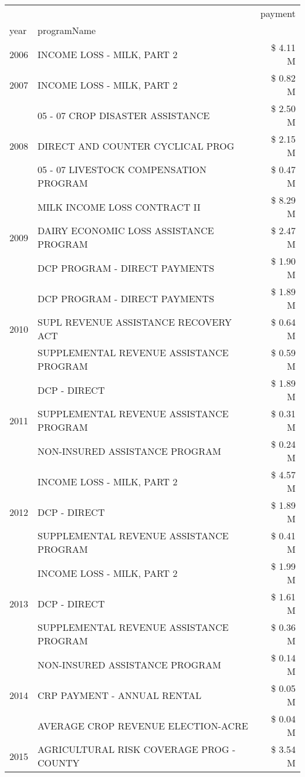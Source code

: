 \begin{tabular}{llr}
\toprule
 &  & payment \\
year & programName &  \\
\midrule
2006 & INCOME LOSS - MILK, PART 2 & \$ 4.11 M \\
\cline{1-3}
2007 & INCOME LOSS - MILK, PART 2 & \$ 0.82 M \\
\cline{1-3}
\multirow[t]{3}{*}{2008} & 05 - 07 CROP DISASTER ASSISTANCE & \$ 2.50 M \\
 & DIRECT AND COUNTER CYCLICAL PROG & \$ 2.15 M \\
 & 05 - 07 LIVESTOCK COMPENSATION PROGRAM & \$ 0.47 M \\
\cline{1-3}
\multirow[t]{3}{*}{2009} & MILK INCOME LOSS CONTRACT II & \$ 8.29 M \\
 & DAIRY ECONOMIC LOSS ASSISTANCE PROGRAM & \$ 2.47 M \\
 & DCP PROGRAM - DIRECT PAYMENTS & \$ 1.90 M \\
\cline{1-3}
\multirow[t]{3}{*}{2010} & DCP PROGRAM - DIRECT PAYMENTS & \$ 1.89 M \\
 & SUPL REVENUE ASSISTANCE RECOVERY ACT & \$ 0.64 M \\
 & SUPPLEMENTAL REVENUE ASSISTANCE PROGRAM & \$ 0.59 M \\
\cline{1-3}
\multirow[t]{3}{*}{2011} & DCP - DIRECT & \$ 1.89 M \\
 & SUPPLEMENTAL REVENUE ASSISTANCE PROGRAM & \$ 0.31 M \\
 & NON-INSURED ASSISTANCE PROGRAM & \$ 0.24 M \\
\cline{1-3}
\multirow[t]{3}{*}{2012} & INCOME LOSS - MILK, PART 2 & \$ 4.57 M \\
 & DCP - DIRECT & \$ 1.89 M \\
 & SUPPLEMENTAL REVENUE ASSISTANCE PROGRAM & \$ 0.41 M \\
\cline{1-3}
\multirow[t]{3}{*}{2013} & INCOME LOSS - MILK, PART 2 & \$ 1.99 M \\
 & DCP - DIRECT & \$ 1.61 M \\
 & SUPPLEMENTAL REVENUE ASSISTANCE PROGRAM & \$ 0.36 M \\
\cline{1-3}
\multirow[t]{3}{*}{2014} & NON-INSURED ASSISTANCE PROGRAM & \$ 0.14 M \\
 & CRP PAYMENT - ANNUAL RENTAL & \$ 0.05 M \\
 & AVERAGE CROP REVENUE ELECTION-ACRE & \$ 0.04 M \\
\cline{1-3}
\multirow[t]{3}{*}{2015} & AGRICULTURAL RISK COVERAGE PROG - COUNTY & \$ 3.54 M \\

\end{tabular}
